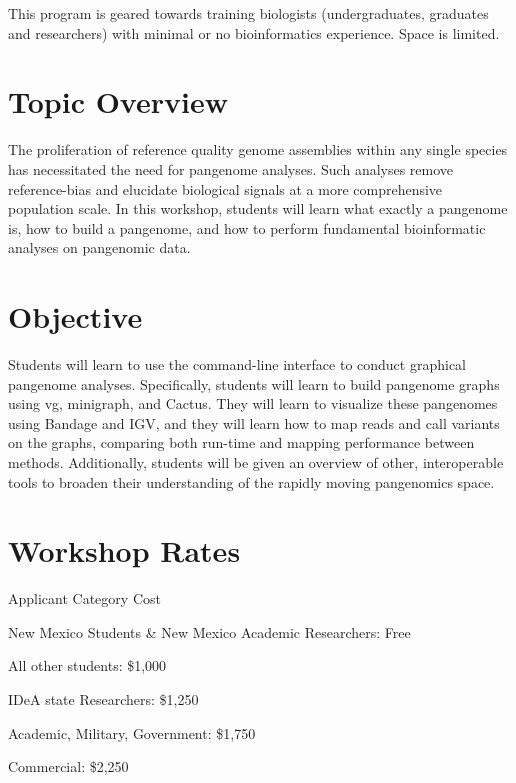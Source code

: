 \documentclass[
]{book}
\begin{document}
This program is geared towards training biologists (undergraduates, graduates and researchers) with minimal or no bioinformatics experience. Space is limited.

\hypertarget{topic-overview}{%
\section*{Topic Overview}\label{topic-overview}}

The proliferation of reference quality genome assemblies within any single species has necessitated the need for pangenome analyses. Such analyses remove reference-bias and elucidate biological signals at a more comprehensive population scale. In this workshop, students will learn what exactly a pangenome is, how to build a pangenome, and how to perform fundamental bioinformatic analyses on pangenomic data.

\hypertarget{objective}{%
\section*{Objective}\label{objective}}

Students will learn to use the command-line interface to conduct graphical pangenome analyses. Specifically, students will learn to build pangenome graphs using vg, minigraph, and Cactus. They will learn to visualize these pangenomes using Bandage and IGV, and they will learn how to map reads and call variants on the graphs, comparing both run-time and mapping performance between methods. Additionally, students will be given an overview of other, interoperable tools to broaden their understanding of the rapidly moving pangenomics space.

\hypertarget{workshop-rates}{%
\section*{Workshop Rates}\label{workshop-rates}}

Applicant Category Cost

New Mexico Students \& New Mexico Academic Researchers:
Free

All other students:
\$1,000

IDeA state Researchers:
\$1,250

Academic, Military, Government:
\$1,750

Commercial:
\$2,250
\end{document}
